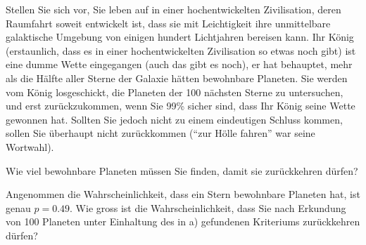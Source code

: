 Stellen Sie sich vor, Sie leben auf in einer hochentwickelten Zivilisation,
deren Raumfahrt soweit entwickelt ist, dass sie mit Leichtigkeit ihre
unmittelbare galaktische Umgebung von einigen hundert Lichtjahren
bereisen kann. Ihr König (erstaunlich, dass es in einer hochentwickelten
Zivilisation so etwas noch gibt) ist eine dumme Wette eingegangen (auch
das gibt es noch), er hat behauptet, mehr als die Hälfte aller Sterne der
Galaxie hätten bewohnbare Planeten. Sie werden vom König losgeschickt,
die Planeten der
100 nächsten Sterne zu untersuchen, und erst zurückzukommen, wenn
Sie 99\% sicher sind, dass Ihr König seine Wette gewonnen hat.
Sollten Sie jedoch nicht zu einem eindeutigen Schluss kommen, sollen Sie
überhaupt nicht zurückkommen (``zur Hölle fahren'' war seine Wortwahl).
\begin{teilaufgaben}
\item
Wie viel bewohnbare Planeten müssen Sie finden, damit sie zurückkehren
dürfen?
\item
Angenommen die Wahrscheinlichkeit, dass ein Stern bewohnbare Planeten
hat, ist genau $p=0.49$.
Wie gross ist die Wahrscheinlichkeit, dass Sie nach Erkundung von 100
Planeten unter Einhaltung des in a) gefundenen Kriteriums zurückkehren
dürfen?
\end{teilaufgaben}


